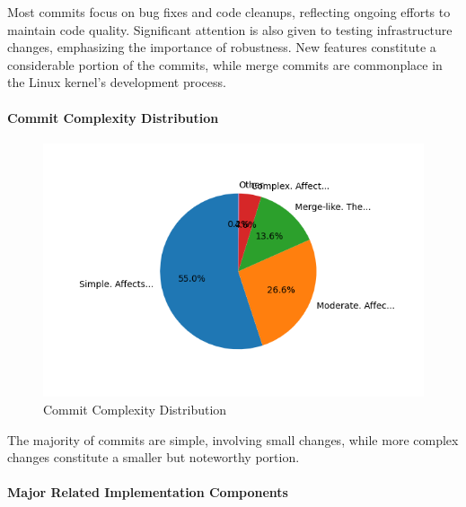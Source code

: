 Most commits focus on bug fixes and code cleanups, reflecting ongoing efforts to maintain code quality. Significant attention is also given to testing infrastructure changes, emphasizing the importance of robustness. New features constitute a considerable portion of the commits, while merge commits are commonplace in the Linux kernel's development process.

\paragraph{Commit Complexity Distribution}

\begin{figure}[ht]
    \centering
    \includegraphics[width=\linewidth]{feature-analysis/commit_pie_chart_commit_complexity.png}
    \caption{Commit Complexity Distribution}
    \label{fig:commit_pie_chart_commit_complexity}
\end{figure}

The majority of commits are simple, involving small changes, while more complex changes constitute a smaller but noteworthy portion.

\paragraph{Major Related Implementation Components}

